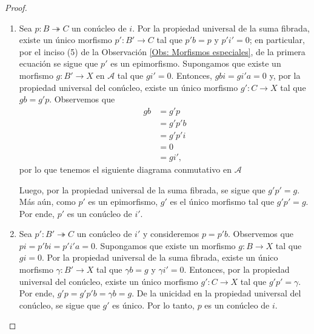 \documentclass[tesis]{subfiles}
\begin{document}
\begin{proof}\leavevmode

    \begin{enumerate}[label=(\alph*)]
    
        \item Sea $p:B\twoheadrightarrow C$ un conúcleo de $i$. Por la propiedad universal de la suma fibrada, existe un único morfismo $p':B'\to C$ tal que $p'b=p$ y $p' i'=0$; en particular, por el inciso (5) de la Observación \ref{Obs: Morfismos especiales}, de la primera ecuación se sigue que $p'$ es un epimorfismo. Supongamos que existe un morfismo $g:B'\to X$ en $\mathscr{A}$ tal que $gi'=0$. Entonces, $gbi=gi'a=0$ y, por la propiedad universal del conúcleo, existe un único morfismo $g':C\to X$ tal que $gb=g'p$. Observemos que
    \begin{align*}
        gb &= g'p \\
            &= g'p'b \\
            &= g'p'i \\
            &= 0 \\
            &= gi',
    \end{align*}
    por lo que tenemos el siguiente diagrama conmutativo en $\mathscr{A}$
    \begin{center}
    \end{center}
    Luego, por la propiedad universal de la suma fibrada, se sigue que $g'p'=g$. Más aún, como $p'$ es un epimorfismo, $g'$ es el único morfismo tal que $g'p'=g$. Por ende, $p'$ es un conúcleo de $i'$. 

        \item Sea $p':B'\twoheadrightarrow C$ un conúcleo de $i'$ y consideremos $p=p'b$. Observemos que $pi = p'bi = p'i'a=0$. Supongamos que existe un morfismo $g:B\to X$ tal que $gi=0$. Por la propiedad universal de la suma fibrada, existe un único morfismo $\gamma:B'\to X$ tal que $\gamma b=g$ y $\gamma i'=0$. Entonces, por la propiedad universal del conúcleo, existe un único morfismo $g':C\to X$ tal que $g'p'=\gamma$. Por ende, $g'p=g'p'b=\gamma b=g$. De la unicidad en la propiedad universal del conúcleo, se sigue que $g'$ es único. Por lo tanto, $p$ es un conúcleo de $i$.
    \end{enumerate}
\end{proof}
\end{document}
